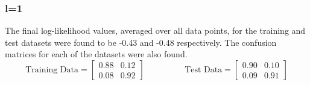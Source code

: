 \documentclass[12pt]{article}
\begin{document}
\subsubsection*{l=1}
The final log-likelihood values, averaged over all data points, for the training and test datasets were found to be -0.43 and -0.48 respectively. The confusion matrices for each of the datasets were also found. 
\begin{equation*}
  \text{Training Data} = 
  \begin{bmatrix}
    0.88 & 0.12  \\
    0.08 & 0.92 
  \end{bmatrix}
  \hspace{2cm}
  \text{Test Data} =
  \begin{bmatrix}
    0.90 & 0.10  \\
    0.09 & 0.91 
  \end{bmatrix}
\end{equation*}
\end{document}
